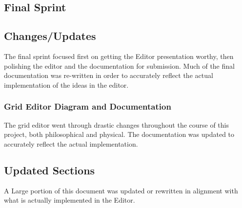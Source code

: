 \documentclass[12pt]{article}
\begin{document}
\begin{appendices}
      \clearpage
      
      
      
      \section{Final Sprint} 
        \subsection{Changes/Updates}
          The final sprint focused first on getting the Editor presentation worthy, then polishing the editor and the documentation for submission. Much of the final documentation was re-written in order to accurately reflect the actual implementation of the ideas in the editor.
        
          \subsubsection {Grid Editor Diagram and Documentation}
            The grid editor went through drastic changes throughout the course of this project, both philosophical and physical. The documentation was updated to accurately reflect the actual implementation.
          
        
        \subsection{Updated Sections}
          A Large portion of this document was updated or rewritten in alignment with what is actually implemented in the Editor.
          

\end{appendices}
\end{document}
